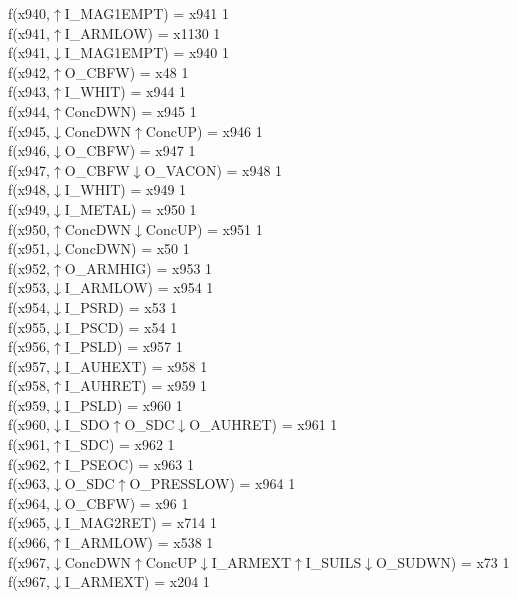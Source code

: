 f(x940,$\uparrow$I\_MAG1EMPT) = x941 {1} \\
f(x941,$\uparrow$I\_ARMLOW) = x1130 {1} \\
f(x941,$\downarrow$I\_MAG1EMPT) = x940 {1} \\
f(x942,$\uparrow$O\_CBFW) = x48 {1} \\
f(x943,$\uparrow$I\_WHIT) = x944 {1} \\
f(x944,$\uparrow$ConcDWN) = x945 {1} \\
f(x945,$\downarrow$ConcDWN$\uparrow$ConcUP) = x946 {1} \\
f(x946,$\downarrow$O\_CBFW) = x947 {1} \\
f(x947,$\uparrow$O\_CBFW$\downarrow$O\_VACON) = x948 {1} \\
f(x948,$\downarrow$I\_WHIT) = x949 {1} \\
f(x949,$\downarrow$I\_METAL) = x950 {1} \\
f(x950,$\uparrow$ConcDWN$\downarrow$ConcUP) = x951 {1} \\
f(x951,$\downarrow$ConcDWN) = x50 {1} \\
f(x952,$\uparrow$O\_ARMHIG) = x953 {1} \\
f(x953,$\downarrow$I\_ARMLOW) = x954 {1} \\
f(x954,$\downarrow$I\_PSRD) = x53 {1} \\
f(x955,$\downarrow$I\_PSCD) = x54 {1} \\
f(x956,$\uparrow$I\_PSLD) = x957 {1} \\
f(x957,$\downarrow$I\_AUHEXT) = x958 {1} \\
f(x958,$\uparrow$I\_AUHRET) = x959 {1} \\
f(x959,$\downarrow$I\_PSLD) = x960 {1} \\
f(x960,$\downarrow$I\_SDO$\uparrow$O\_SDC$\downarrow$O\_AUHRET) = x961 {1} \\
f(x961,$\uparrow$I\_SDC) = x962 {1} \\
f(x962,$\uparrow$I\_PSEOC) = x963 {1} \\
f(x963,$\downarrow$O\_SDC$\uparrow$O\_PRESSLOW) = x964 {1} \\
f(x964,$\downarrow$O\_CBFW) = x96 {1} \\
f(x965,$\downarrow$I\_MAG2RET) = x714 {1} \\
f(x966,$\uparrow$I\_ARMLOW) = x538 {1} \\
f(x967,$\downarrow$ConcDWN$\uparrow$ConcUP$\downarrow$I\_ARMEXT$\uparrow$I\_SUILS$\downarrow$O\_SUDWN) = x73 {1} \\
f(x967,$\downarrow$I\_ARMEXT) = x204 {1} \\

